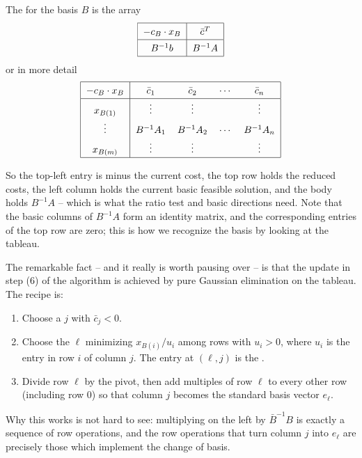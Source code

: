 \documentclass[a4paper]{scrartcl}
\begin{document}
\begin{definition}
    The  for the basis $B$ is the array
    $$
    \arraycolsep=6pt\def\arraystretch{1.4}
    \begin{array}{|c|c|}\hline
        -c_B\cdot x_B & \bar c^T \\\hline
        B^{-1}b & B^{-1}A \\\hline
    \end{array}
    $$
    or in more detail
    $$
    \arraycolsep=6pt\def\arraystretch{1.4}
    \begin{array}{|c|cccc|}\hline
        -c_B \cdot x_B & \bar c_1 & \bar c_2 & \cdots & \bar c_n \\\hline
        x_{B(1)} & \vdots & \vdots & & \vdots \\
        \vdots & B^{-1}A_1 & B^{-1}A_2 & \cdots & B^{-1}A_n\\
        x_{B(m)} & \vdots & \vdots & & \vdots\\\hline
    \end{array}
    $$
\end{definition}

So the top-left entry is minus the current cost, the top row holds the reduced costs, the left column holds the current basic feasible solution, and the body holds $B^{-1}A$ -- which is what the ratio test and basic directions need. Note that the basic columns of $B^{-1}A$ form an identity matrix, and the corresponding entries of the top row are zero; this is how we recognize the basis by looking at the tableau.

The remarkable fact -- and it really is worth pausing over -- is that the update in step (6) of the algorithm is achieved by pure Gaussian elimination on the tableau. The recipe is:
\begin{enumerate}[label=(\roman*)]
    \item Choose a  $j$ with $\bar c_j < 0$.
    \item Choose the  $\ell$ minimizing $x_{B(i)}/u_i$ among rows with $u_i > 0$, where $u_i$ is the entry in row $i$ of column $j$. The entry at $(\ell, j)$ is the .
    \item Divide row $\ell$ by the pivot, then add multiples of row $\ell$ to every other row (including row $0$) so that column $j$ becomes the standard basis vector $e_\ell$.
\end{enumerate}
Why this works is not hard to see: multiplying on the left by $\bar B^{-1}B$ is exactly a sequence of row operations, and the row operations that turn column $j$ into $e_\ell$ are precisely those which implement the change of basis.
\end{document}
